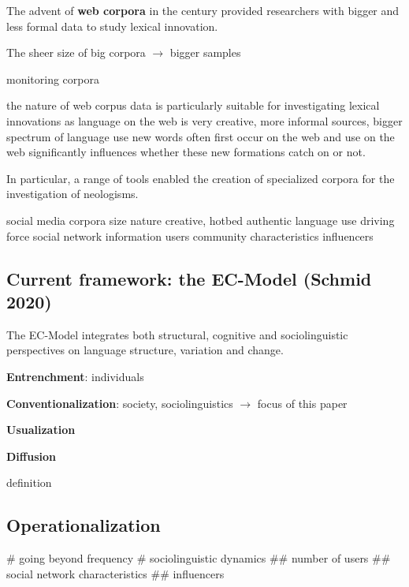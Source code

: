 \documentclass[
  a4paper,
  ]{scrartcl}
\renewcommand{\hw}[1]{\textbf{#1}}
\begin{document}
    The advent of \hw{web corpora} in the  century provided researchers with bigger and less formal data to study lexical innovation.

      The sheer size of big corpora $\rightarrow$ bigger samples

      monitoring corpora~\parencite{Davies2013}

      the nature of web corpus data is particularly suitable for investigating lexical innovations as
        language on the web is very creative,
        more informal sources, bigger spectrum of language use
        new words often first occur on the web
        and use on the web significantly influences whether these new formations catch on or not.

      In particular, a range of tools enabled the creation of specialized corpora for the investigation of neologisms.~\parencite{Renouf2006,Kerremans2012,Lemnitzer,Gerard2017,Cartier2017}

    social media corpora \cite{Grieve2016,Eisenstein2014}
      size
      nature
        creative, hotbed
        authentic language use
        driving force
      social network information
        users
        community characteristics
        influencers

  \subsection{Current framework: the EC-Model (Schmid 2020)}
    \nocite{Schmid2020}

    The EC-Model integrates both structural, cognitive and sociolinguistic perspectives on language structure, variation and change.

    \hw{Entrenchment}: individuals

    \hw{Conventionalization}: society, sociolinguistics $\rightarrow$ focus of this paper

    \hw{Usualization}

    \hw{Diffusion}

      definition

  \subsection{Operationalization}

    \begin{easylist}[itemize]
      # going beyond frequency
      # sociolinguistic dynamics
        ## number of users
        ## social network characteristics
        ## influencers
    \end{easylist}
\end{document}
